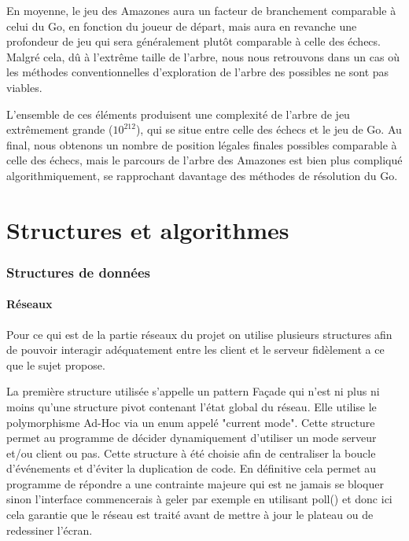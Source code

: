 \documentclass[12pt,a4paper,titlepage,oneside]{article}
\begin{document}
        En moyenne, le jeu des Amazones aura un facteur de branchement comparable à celui du Go, en fonction du joueur de départ, mais aura en revanche une profondeur de jeu qui sera généralement plutôt comparable à celle des échecs. Malgré cela, dû à l'extrême taille de l'arbre, nous nous retrouvons dans un cas où les méthodes conventionnelles d'exploration de l'arbre des possibles ne sont pas viables.
        
        L'ensemble de ces éléments produisent une complexité de l'arbre de jeu extrêmement grande ($10^{212}$), qui se situe entre celle des échecs et le jeu de Go. Au final, nous obtenons un nombre de position légales finales possibles comparable à celle des échecs, mais le parcours de l'arbre des Amazones est bien plus compliqué algorithmiquement, se rapprochant davantage des méthodes de résolution du Go.
        
        \newpage

    \part{Structures et algorithmes}
    \section{Structures de données} 
    \subsection{Réseaux}
        Pour ce qui est de la partie réseaux du projet on utilise plusieurs structures afin de pouvoir interagir adéquatement entre les client et le serveur fidèlement a ce que le sujet propose. \newline

        
        La première structure utilisée s’appelle un pattern Façade qui n'est ni plus ni moins qu'une structure pivot contenant l'état global du réseau. Elle utilise le polymorphisme Ad-Hoc via un enum  appelé "current mode". Cette structure permet au programme de décider dynamiquement d'utiliser un mode serveur et/ou client ou pas.
        Cette structure à été choisie afin de centraliser la boucle d’événements et d'éviter la duplication de code. En définitive cela permet au programme de répondre a une contrainte majeure qui est ne jamais se bloquer sinon l'interface commencerais à geler par exemple en utilisant poll() et donc ici cela garantie que le réseau est traité avant de mettre à jour le plateau ou de redessiner l'écran.\newline
\end{document}
